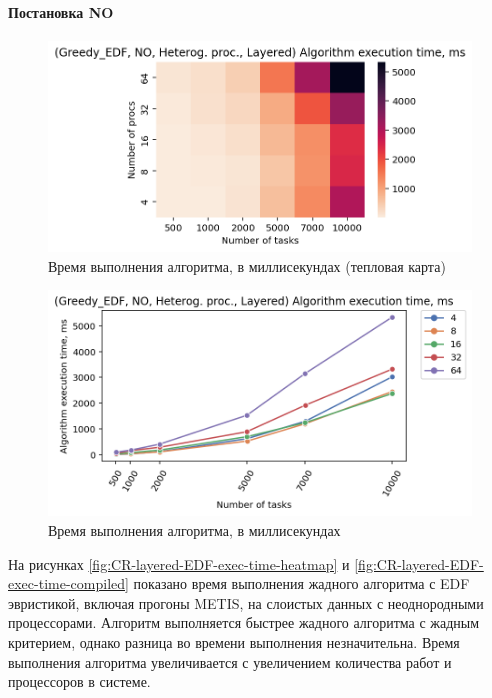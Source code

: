 \paragraph{Постановка NO}

\begin{figure}[!htbp]
    \centering
    \includegraphics[width=\textwidth]{imgs/unbalanced/NO_EDF/et_heatmap.png}
    \caption{Время выполнения алгоритма, в миллисекундах (тепловая карта)}
    \label{fig:NO-EDF-exec-time-heatmap}
\end{figure}

\begin{figure}[!htbp]
    \centering
    \includegraphics[width=\textwidth]{imgs/unbalanced/NO_EDF/tr_graph.png}
    \caption{Время выполнения алгоритма, в миллисекундах}
    \label{fig:NO-EDF-exec-time-compiled}
\end{figure}

На рисунках \ref{fig:CR-layered-EDF-exec-time-heatmap} и \ref{fig:CR-layered-EDF-exec-time-compiled} показано время выполнения жадного алгоритма с EDF эвристикой, включая прогоны METIS, на слоистых данных с неоднородными процессорами. Алгоритм выполняется быстрее жадного алгоритма с жадным критерием, однако разница во времени выполнения незначительна. Время выполнения алгоритма увеличивается с увеличением количества работ и процессоров в системе.